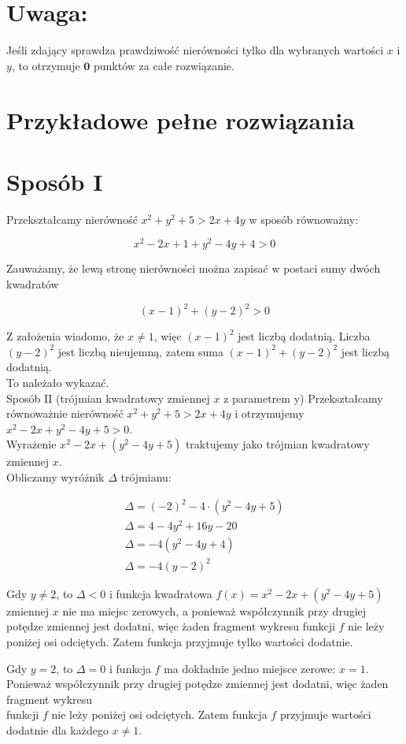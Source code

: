 \documentclass[10pt]{article}
\begin{document}
\section*{Uwaga:}
Jeśli zdający sprawdza prawdziwość nierówności tylko dla wybranych wartości $x$ i $y$, to otrzymuje $\mathbf{0}$ punktów za całe rozwiązanie.

\section*{Przykładowe pełne rozwiązania}
\section*{Sposób I}
Przekształcamy nierówność $x^{2}+y^{2}+5>2 x+4 y$ w sposób równoważny:

$$
x^{2}-2 x+1+y^{2}-4 y+4>0
$$

Zauważamy, że lewą stronę nierówności można zapisać w postaci sumy dwóch kwadratów

$$
(x-1)^{2}+(y-2)^{2}>0
$$

Z założenia wiadomo, że $x \neq 1$, więc $(x-1)^{2}$ jest liczbą dodatnią. Liczba $(y-2)^{2}$ jest liczbą nieujemną, zatem suma $(x-1)^{2}+(y-2)^{2}$ jest liczbą dodatnią.\\
To należało wykazać.\\
Sposób II (trójmian kwadratowy zmiennej $x$ z parametrem y) Przekształcamy równoważnie nierówność $x^{2}+y^{2}+5>2 x+4 y$ i otrzymujemy $x^{2}-2 x+y^{2}-4 y+5>0$.\\
Wyrażenie $x^{2}-2 x+\left(y^{2}-4 y+5\right)$ traktujemy jako trójmian kwadratowy zmiennej $x$.\\
Obliczamy wyróżnik $\Delta$ trójmianu:

$$
\begin{gathered}
\Delta=(-2)^{2}-4 \cdot\left(y^{2}-4 y+5\right) \\
\Delta=4-4 y^{2}+16 y-20 \\
\Delta=-4\left(y^{2}-4 y+4\right) \\
\Delta=-4(y-2)^{2}
\end{gathered}
$$

Gdy $y \neq 2$, to $\Delta<0$ i funkcja kwadratowa $f(x)=x^{2}-2 x+\left(y^{2}-4 y+5\right)$ zmiennej $x$ nie ma miejsc zerowych, a ponieważ współczynnik przy drugiej potędze zmiennej jest dodatni, więc żaden fragment wykresu funkcji $f$ nie leży poniżej osi odciętych. Zatem funkcja przyjmuje tylko wartości dodatnie.

Gdy $y=2$, to $\Delta=0$ i funkcja $f$ ma dokładnie jedno miejsce zerowe: $x=1$. Ponieważ współczynnik przy drugiej potędze zmiennej jest dodatni, więc żaden fragment wykresu\\
funkcji $f$ nie leży poniżej osi odciętych. Zatem funkcja $f$ przyjmuje wartości dodatnie dla każdego $x \neq 1$.
\end{document}

